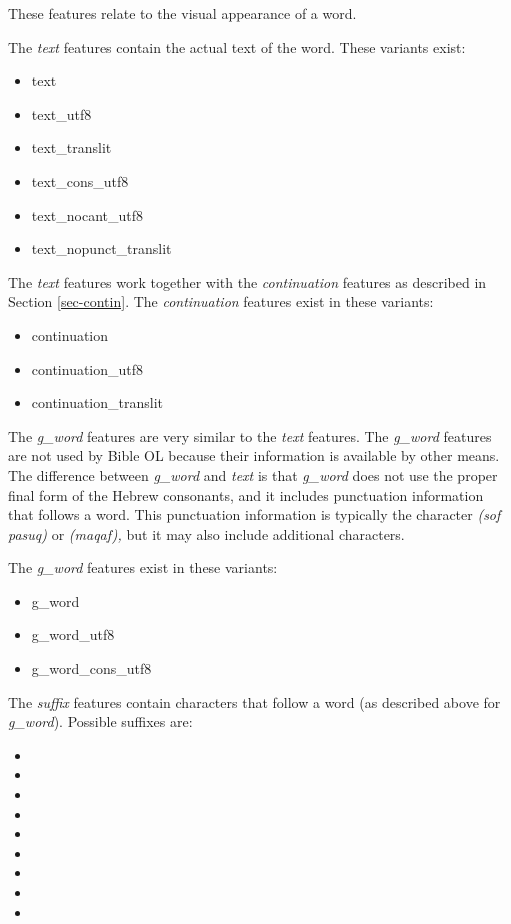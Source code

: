 \documentclass[11pt,oneside,a4paper]{memoir}
\newcommand{\heb}[1]{{\RL {\ezr #1}}}
\begin{document}
These features relate to the visual appearance of a word.

The \emph{text} features contain the actual text of the word. These variants exist:

\begin{itemize}
\item text
\item text\_utf8
\item text\_translit
\item text\_cons\_utf8
\item text\_nocant\_utf8
\item text\_nopunct\_translit
\end{itemize}

The \emph{text} features work together with the \emph{continuation} features as described in Section
\ref{sec-contin}. The \emph{continuation} features exist
in these variants:

\begin{itemize}
\item continuation
\item continuation\_utf8
\item continuation\_translit
\end{itemize}

The \emph{g\_word} features are very similar to the \emph{text} features.
The \emph{g\_word} features are not used by Bible OL because their information is available by other means. The
difference between \emph{g\_word} and \emph{text} is that \emph{g\_word} does not use the proper final form of the Hebrew
consonants, and it includes punctuation information that follows a word. This punctuation information
is typically the character \heb{׃} \emph{(sof pasuq)} or \heb{־} \emph{(maqaf),} but it may also include
additional characters.

The \emph{g\_word} features exist in these variants:

\begin{itemize}
\item g\_word
\item g\_word\_utf8
\item g\_word\_cons\_utf8
\end{itemize}

The \emph{suffix} features contain characters that follow a word (as
described above for \emph{g\_word}). Possible suffixes are:

\begin{itemize}
\item \heb{־}
\item \heb{׃}
\item \heb{ס}
\item \heb{פ}
\item \heb{׃ נ}
\item \heb{׃ נ ס}
\item \heb{׃ נ פ}
\item \heb{׃ ס}
\item \heb{׃ פ}
\end{itemize}
\end{document}
